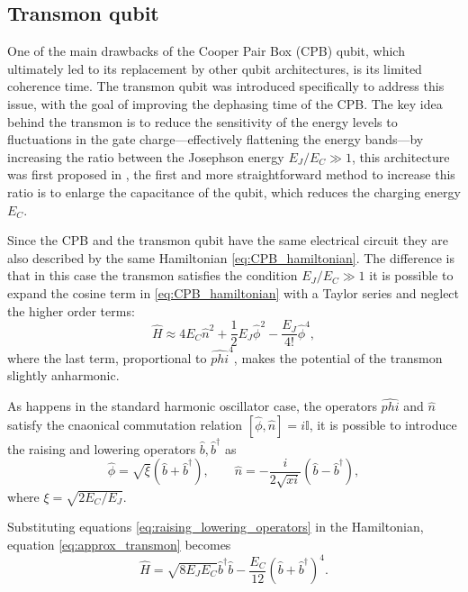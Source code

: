 \subsection{Transmon qubit}
One of the main drawbacks of the Cooper Pair Box (CPB) qubit, which ultimately led to its replacement by other qubit architectures, is its limited coherence time. 
The transmon qubit was introduced specifically to address this issue, with the goal of improving the dephasing time of the CPB. The key idea behind the transmon is to reduce the sensitivity of the energy levels to fluctuations in the gate charge—effectively flattening the energy bands—by increasing the ratio between the Josephson energy $E_J/E_C \gg 1$,
this architecture was first proposed in \cite{TransmonPaper}, the first and more straightforward method to increase this ratio is to enlarge the capacitance of the qubit, which reduces the charging energy $E_C$.

Since the CPB and the transmon qubit have the same electrical circuit they are also described by the same Hamiltonian \ref{eq:CPB_hamiltonian}. 
The difference is that in this case the transmon satisfies the condition $E_J/E_C \gg 1$ it is possible to expand the cosine term in \ref{eq:CPB_hamiltonian} with a Taylor series and neglect the higher order terms:
\begin{equation}\label{eq:approx_transmon}
    \hat{H}\approx 4E_C\hat{n}^2 + \frac{1}{2}E_J\hat{\phi}^2 - \frac{E_J}{4!}\hat{\phi}^4,
\end{equation}
where the last term, proportional to $\hat{phi}^4$, makes the potential of the transmon slightly anharmonic.

As happens in the standard harmonic oscillator case, the operators $\hat{phi}$ and $\hat{n}$ satisfy the cnaonical commutation relation $[\hat{\phi},\hat{n}]=i\mathbb{I}$, it is possible to introduce the raising and lowering operators $\hat{b},\hat{b}^\dagger$ as
\begin{equation}\label{eq:raising_lowering_operators}
    \hat{\phi} = \sqrt{\xi}(\hat{b}+\hat{b}^\dagger), \quad\quad \hat{n} = -\frac{i}{2\sqrt{xi}}(\hat{b}-\hat{b}^\dagger),
\end{equation}
where $\xi =  \sqrt{2E_C/E_J}$.

Substituting equations \ref{eq:raising_lowering_operators} in the Hamiltonian, equation \ref{eq:approx_transmon} becomes
\begin{equation}\label{eq:transmon_hamiltonian}
    \hat{H} = \sqrt{8E_JE_C}\hat{b}^\dagger\hat{b} - \frac{E_C}{12}(\hat{b}+\hat{b}^\dagger)^4.
\end{equation}

